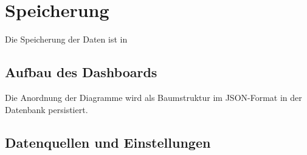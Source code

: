 \section{Speicherung}
\label{sec:speicherung}
Die Speicherung der Daten ist in 

\subsection{Aufbau des Dashboards}
\label{subsec:aufbaudesdashboards}
Die Anordnung der Diagramme wird als Baumstruktur im JSON-Format in der Datenbank persistiert.

\subsection{Datenquellen und Einstellungen}
\label{subsec:datenquellenundeinstellungen}
